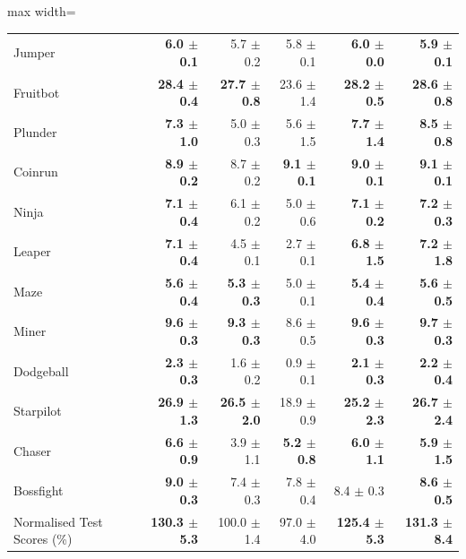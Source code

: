 \begin{table}[H]
\begin{center}
\begin{small}
\begin{sc}
\begin{adjustbox}{max width=\linewidth}
\begin{tabular}{lrrrrr}
                     Jumper &   \textbf{6.0 $\pm$ 0.1} &           5.7 $\pm$ 0.2 &          5.8 $\pm$ 0.1 &            \textbf{6.0 $\pm$ 0.0} &            \textbf{5.9 $\pm$ 0.1} \\
                   Fruitbot &  \textbf{28.4 $\pm$ 0.4} & \textbf{27.7 $\pm$ 0.8} &         23.6 $\pm$ 1.4 &           \textbf{28.2 $\pm$ 0.5} &           \textbf{28.6 $\pm$ 0.8} \\
                    Plunder &   \textbf{7.3 $\pm$ 1.0} &           5.0 $\pm$ 0.3 &          5.6 $\pm$ 1.5 &            \textbf{7.7 $\pm$ 1.4} &            \textbf{8.5 $\pm$ 0.8} \\
                    Coinrun &   \textbf{8.9 $\pm$ 0.2} &           8.7 $\pm$ 0.2 & \textbf{9.1 $\pm$ 0.1} &            \textbf{9.0 $\pm$ 0.1} &            \textbf{9.1 $\pm$ 0.1} \\
                      Ninja &   \textbf{7.1 $\pm$ 0.4} &           6.1 $\pm$ 0.2 &          5.0 $\pm$ 0.6 &            \textbf{7.1 $\pm$ 0.2} &            \textbf{7.2 $\pm$ 0.3} \\
                     Leaper &   \textbf{7.1 $\pm$ 0.4} &           4.5 $\pm$ 0.1 &          2.7 $\pm$ 0.1 &            \textbf{6.8 $\pm$ 1.5} &            \textbf{7.2 $\pm$ 1.8} \\
                       Maze &   \textbf{5.6 $\pm$ 0.4} &  \textbf{5.3 $\pm$ 0.3} &          5.0 $\pm$ 0.1 &            \textbf{5.4 $\pm$ 0.4} &            \textbf{5.6 $\pm$ 0.5} \\
                      Miner &   \textbf{9.6 $\pm$ 0.3} &  \textbf{9.3 $\pm$ 0.3} &          8.6 $\pm$ 0.5 &            \textbf{9.6 $\pm$ 0.3} &            \textbf{9.7 $\pm$ 0.3} \\
                  Dodgeball &   \textbf{2.3 $\pm$ 0.3} &           1.6 $\pm$ 0.2 &          0.9 $\pm$ 0.1 &            \textbf{2.1 $\pm$ 0.3} &            \textbf{2.2 $\pm$ 0.4} \\
                  Starpilot &  \textbf{26.9 $\pm$ 1.3} & \textbf{26.5 $\pm$ 2.0} &         18.9 $\pm$ 0.9 &           \textbf{25.2 $\pm$ 2.3} &           \textbf{26.7 $\pm$ 2.4} \\
                     Chaser &   \textbf{6.6 $\pm$ 0.9} &           3.9 $\pm$ 1.1 & \textbf{5.2 $\pm$ 0.8} &            \textbf{6.0 $\pm$ 1.1} &            \textbf{5.9 $\pm$ 1.5} \\
                  Bossfight &   \textbf{9.0 $\pm$ 0.3} &           7.4 $\pm$ 0.3 &          7.8 $\pm$ 0.4 &                     8.4 $\pm$ 0.3 &            \textbf{8.6 $\pm$ 0.5} \\
\midrule
Normalised Test Scores (\%) & \textbf{130.3 $\pm$ 5.3} &         100.0 $\pm$ 1.4 &         97.0 $\pm$ 4.0 &          \textbf{125.4 $\pm$ 5.3} &          \textbf{131.3 $\pm$ 8.4} \\
\bottomrule
\end{tabular}
\end{adjustbox}
\end{sc}
\end{small}
\end{center}
\vskip -0.1in
\end{table}

